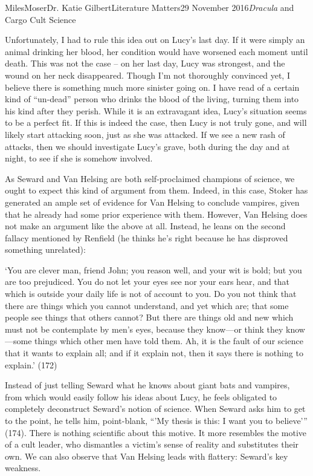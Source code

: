 \documentclass[12pt,letterpaper]{article}
\renewenvironment{quote}
  {\list{}{\rightmargin=0.5in \leftmargin=0.5in}%
   \item\relax}
  {\endlist}
\begin{document}
\begin{mla}{Miles}{Moser}{Dr. Katie Gilbert}{Literature Matters}{29 November 2016}{\textit{Dracula} and Cargo Cult Science}
\begin{quote}
Unfortunately, I had to rule this idea out on Lucy’s last day. If it were simply an animal drinking her blood, her condition would have worsened each moment until death. This was not the case – on her last day, Lucy was strongest, and the wound on her neck disappeared. Though I’m not thoroughly convinced yet, I believe there is something much more sinister going on. I have read of a certain kind of “un-dead” person who drinks the blood of the living, turning them into his kind after they perish. While it is an extravagant idea, Lucy’s situation seems to be a perfect fit. If this is indeed the case, then Lucy is not truly gone, and will likely start attacking soon, just as she was attacked. If we see a new rash of attacks, then we should investigate Lucy’s grave, both during the day and at night, to see if she is somehow involved.
\end{quote}

As Seward and Van Helsing are both self-proclaimed champions of science, we ought to expect this kind of argument from them. Indeed, in this case, Stoker has generated an ample set of evidence for Van Helsing to conclude vampires, given that he already had some prior experience with them. However, Van Helsing does not make an argument like the above at all. Instead, he leans on the second fallacy mentioned by Renfield (he thinks he’s right because he has disproved something unrelated):

\begin{quote}
‘You are clever man, friend John; you reason well, and your wit is bold; but you are too prejudiced. You do not let your eyes see nor your ears hear, and that which is outside your daily life is not of account to you. Do you not think that there are things which you cannot understand, and yet which are; that some people see things that others cannot? But there are things old and new which must not be contemplate by men’s eyes, because they know—or think they know—some things which other men have told them. Ah, it is the fault of our science that it wants to explain all; and if it explain not, then it says there is nothing to explain.’ (172)
\end{quote}

Instead of just telling Seward what he knows about giant bats and vampires, from which would easily follow his ideas about Lucy, he feels obligated to completely deconstruct Seward’s notion of science. When Seward asks him to get to the point, he tells him, point-blank, “’My thesis is this: I want you to believe’” (174). There is nothing scientific about this motive. It more resembles the motive of a cult leader, who dismantles a victim’s sense of reality and substitutes their own. We can also observe that Van Helsing leads with flattery: Seward’s key weakness.


\end{mla}
\end{document}
